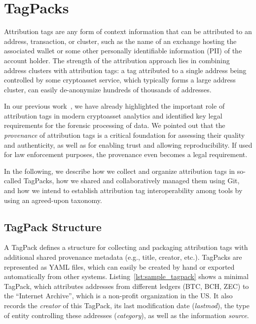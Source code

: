 
\section{TagPacks}
\label{sec:tagpacks}

Attribution tags are any form of context information that can be attributed to an address, transaction, or cluster, such as the name of an exchange hosting the associated wallet or some other personally identifiable information (PII) of the account holder. The strength of the attribution approach lies in combining address clusters with attribution tags: a tag attributed to a single address being controlled by some cryptoasset service, which typically forms a large address cluster, can easily de-anonymize hundreds of thousands of addresses.

In our previous work~\cite{Froewis:2020a}, we have already highlighted the important role of attribution tags in modern cryptoasset analytics and identified key legal requirements for the forensic processing of data. We pointed out that the \emph{provenance} of attribution tags is a critical foundation for assessing their quality and authenticity, as well as for enabling trust and allowing reproducibility. If used for law enforcement purposes, the provenance even becomes a legal requirement.

In the following, we describe how we collect and organize attribution tags in so-called TagPacks, how we shared and collaboratively managed them using Git, and how we intend to establish attribution tag interoperability among tools by using an agreed-upon taxonomy.

\subsection{TagPack Structure}

A TagPack defines a structure for collecting and packaging attribution tags with additional shared provenance metadata (e.g., title, creator, etc.). TagPacks are represented as YAML files, which can easily be created by hand or exported automatically from other systems. Listing~\ref{lst:sample_tagpack} shows a minimal TagPack, which attributes addresses from different ledgers (BTC, BCH, ZEC) to the ``Internet Archive'', which is a non-profit organization in the US. It also records the \emph{creator} of this TagPack, its last modification date (\emph{lastmod}), the type of entity controlling these addresses (\emph{category}), as well as the information \emph{source}.

